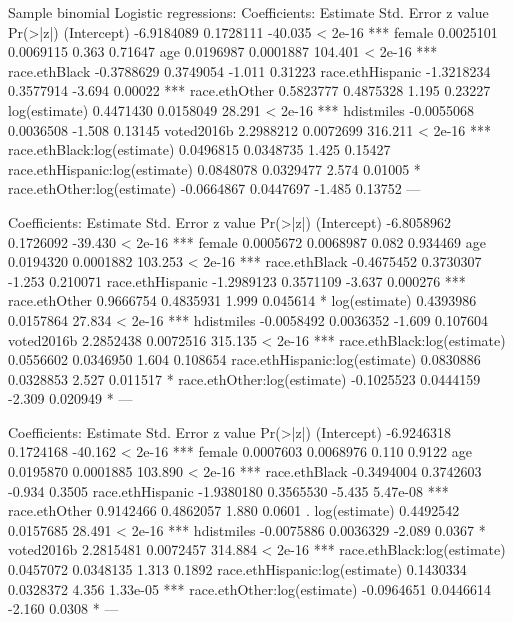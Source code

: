 Sample binomial Logistic regressions:
Coefficients:
                                 Estimate Std. Error z value Pr(>|z|)    
(Intercept)                    -6.9184089  0.1728111 -40.035  < 2e-16 ***
female                          0.0025101  0.0069115   0.363  0.71647    
age                             0.0196987  0.0001887 104.401  < 2e-16 ***
race.ethBlack                  -0.3788629  0.3749054  -1.011  0.31223    
race.ethHispanic               -1.3218234  0.3577914  -3.694  0.00022 ***
race.ethOther                   0.5823777  0.4875328   1.195  0.23227    
log(estimate)                   0.4471430  0.0158049  28.291  < 2e-16 ***
hdistmiles                     -0.0055068  0.0036508  -1.508  0.13145    
voted2016b                      2.2988212  0.0072699 316.211  < 2e-16 ***
race.ethBlack:log(estimate)     0.0496815  0.0348735   1.425  0.15427    
race.ethHispanic:log(estimate)  0.0848078  0.0329477   2.574  0.01005 *  
race.ethOther:log(estimate)    -0.0664867  0.0447697  -1.485  0.13752    
---


Coefficients:
                                 Estimate Std. Error z value Pr(>|z|)    
(Intercept)                    -6.8058962  0.1726092 -39.430  < 2e-16 ***
female                          0.0005672  0.0068987   0.082 0.934469    
age                             0.0194320  0.0001882 103.253  < 2e-16 ***
race.ethBlack                  -0.4675452  0.3730307  -1.253 0.210071    
race.ethHispanic               -1.2989123  0.3571109  -3.637 0.000276 ***
race.ethOther                   0.9666754  0.4835931   1.999 0.045614 *  
log(estimate)                   0.4393986  0.0157864  27.834  < 2e-16 ***
hdistmiles                     -0.0058492  0.0036352  -1.609 0.107604    
voted2016b                      2.2852438  0.0072516 315.135  < 2e-16 ***
race.ethBlack:log(estimate)     0.0556602  0.0346950   1.604 0.108654    
race.ethHispanic:log(estimate)  0.0830886  0.0328853   2.527 0.011517 *  
race.ethOther:log(estimate)    -0.1025523  0.0444159  -2.309 0.020949 *  
---


Coefficients:
                                 Estimate Std. Error z value Pr(>|z|)    
(Intercept)                    -6.9246318  0.1724168 -40.162  < 2e-16 ***
female                          0.0007603  0.0068976   0.110   0.9122    
age                             0.0195870  0.0001885 103.890  < 2e-16 ***
race.ethBlack                  -0.3494004  0.3742603  -0.934   0.3505    
race.ethHispanic               -1.9380180  0.3565530  -5.435 5.47e-08 ***
race.ethOther                   0.9142466  0.4862057   1.880   0.0601 .  
log(estimate)                   0.4492542  0.0157685  28.491  < 2e-16 ***
hdistmiles                     -0.0075886  0.0036329  -2.089   0.0367 *  
voted2016b                      2.2815481  0.0072457 314.884  < 2e-16 ***
race.ethBlack:log(estimate)     0.0457072  0.0348135   1.313   0.1892    
race.ethHispanic:log(estimate)  0.1430334  0.0328372   4.356 1.33e-05 ***
race.ethOther:log(estimate)    -0.0964651  0.0446614  -2.160   0.0308 *  
---






